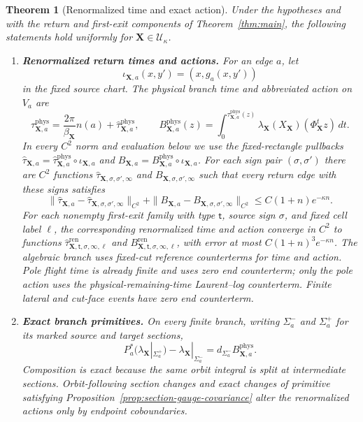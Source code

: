 \documentclass[11pt]{amsart}
\numberwithin{equation}{section}
\newtheorem{theorem}{Theorem}[section]
\theoremstyle{definition}
\theoremstyle{remark}
\newcommand{\cU}{\mathcal U}
\begin{document}
\begin{theorem}[Renormalized time and exact action]
\label{thm:time-action}
Under the hypotheses and with the return and first-exit components of
Theorem~\ref{thm:main}, the following statements hold uniformly for
$\mathbf X\in\cU_\kappa$.
\begin{enumerate}
\renewcommand{\labelenumi}{\textup{(\roman{enumi})}}
\item \textup{\textbf{Renormalized return times and actions.}}
For an edge $a$, let
\[
 \iota_{\mathbf X,a}(x,y')=(x,g_a(x,y'))
\]
in the fixed source chart.  The physical branch time and abbreviated action
on $V_a$ are
\begin{equation}\label{eq:headline-time-action}
 \tau^{\mathrm{phys}}_{\mathbf X,a}
   =\frac{2\pi}{\beta_{\mathbf X}}n(a)
       +\widehat\tau^{\mathrm{phys}}_{\mathbf X,a},
 \qquad
 B^{\mathrm{phys}}_{\mathbf X,a}(z)=
 \int_0^{\tau^{\mathrm{phys}}_{\mathbf X,a}(z)}
    \lambda_{\mathbf X}(X_{\mathbf X})
          (\Phi_{\mathbf X}^tz)\,dt.
\end{equation}
In every $C^2$ norm and evaluation below we use the fixed-rectangle
pullbacks
$\widehat\tau_{\mathbf X,a}
 =\widehat\tau^{\mathrm{phys}}_{\mathbf X,a}\circ\iota_{\mathbf X,a}$ and
$B_{\mathbf X,a}
 =B^{\mathrm{phys}}_{\mathbf X,a}\circ\iota_{\mathbf X,a}$.
For each sign pair $(\sigma,\sigma')$ there are $C^2$ functions
$\widehat\tau_{\mathbf X,\sigma,\sigma',\infty}$ and
$B_{\mathbf X,\sigma,\sigma',\infty}$ such that every return edge with
these signs satisfies
\begin{equation}\label{eq:headline-return-potential-limits}
 \|\widehat\tau_{\mathbf X,a}
      -\widehat\tau_{\mathbf X,\sigma,\sigma',\infty}\|_{C^2}
 +\|B_{\mathbf X,a}-B_{\mathbf X,\sigma,\sigma',\infty}\|_{C^2}
 \le C(1+n)e^{-\kappa n}.
\end{equation}
For each nonempty first-exit family with type $\mathsf t$, source sign
$\sigma$, and fixed cell label $\ell$, the corresponding renormalized time
and action converge in $C^2$ to functions
$\widehat\tau^{\mathrm{ren}}_{\mathbf X,\mathsf t,\sigma,\infty,\ell}$
and $B^{\mathrm{ren}}_{\mathbf X,\mathsf t,\sigma,\infty,\ell}$, with
error at most $C(1+n)^3e^{-\kappa n}$.  The algebraic branch uses fixed-cut
reference counterterms for time and action.  Pole flight time is already
finite and uses zero end counterterm; only the pole action uses the
physical-remaining-time Laurent--log counterterm.  Finite lateral and
cut-face events have zero end counterterm.

\item \textup{\textbf{Exact branch primitives.}}
On every finite branch, writing $\Sigma_a^-$ and $\Sigma_a^+$ for
its marked source and target sections,
\begin{equation}\label{eq:headline-exact}
 P_a^*(\lambda_{\mathbf X}|_{\Sigma_a^+})
  -\lambda_{\mathbf X}|_{\Sigma_a^-}
 =d_{\Sigma_a^-}B^{\mathrm{phys}}_{\mathbf X,a}.
\end{equation}
Composition is exact because the same orbit integral is split at
intermediate sections.  Orbit-following section changes and exact changes
of primitive satisfying Proposition~\ref{prop:section-gauge-covariance}
alter the renormalized actions only by endpoint coboundaries.


\end{enumerate}
\end{theorem}
\end{document}
